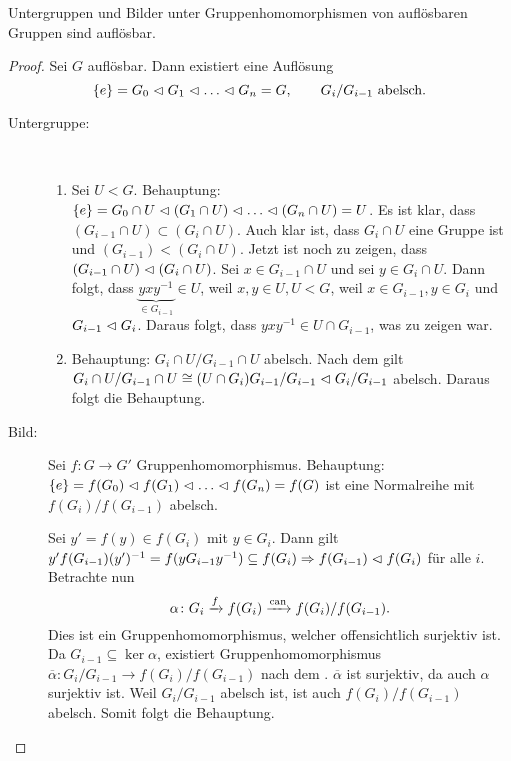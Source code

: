 \documentclass[12pt,a4paper]{scrartcl}
\begin{document}
	\begin{satz}
		Untergruppen und Bilder unter Gruppenhomomorphismen von auflösbaren Gruppen sind auflösbar.
	\end{satz}
	\begin{proof}
		Sei $G$ auflösbar. Dann existiert eine Auflösung 
		\begin{equation*}
			\left\lbrace e\right\rbrace = G_0 \vartriangleleft G_1 \vartriangleleft \ldots \vartriangleleft G_n = G, \qquad  G_i/G_{i-1} \text{ abelsch.}
		\end{equation*}
		\begin{description}
			\item[Untergruppe:]~
				\begin{enumerate}
				\item Sei $U < G$. Behauptung: $\left\lbrace e\right\rbrace = G_0 \cap U \vartriangleleft (G_1 \cap U) \vartriangleleft \ldots \vartriangleleft (G_n \cap U) = U $. Es ist klar, dass $(G_{i-1} \cap U) \subset (G_i \cap U)$. Auch klar ist, dass $G_i \cap U$ eine Gruppe ist und $(G_{i-1} ) < (G_i \cap U)$. Jetzt ist noch zu zeigen, dass $(G_{i-1} \cap U) \vartriangleleft (G_i \cap U)$. Sei $x \in G_{i-1} \cap U$ und sei $y \in G_i \cap U$. Dann folgt, dass $\underbrace{yxy^{-1}}_{\in G_{i-1}} \in U$, weil $x, y \in U, U < G$, weil $x \in G_{i-1}, y \in G_i$ und $G_{i-1} \vartriangleleft G_i$. Daraus folgt, dass $yxy^{-1} \in U \cap G_{i-1}$, was zu zeigen war.
				\item Behauptung: $G_i \cap U / G_{i-1} \cap U$ abelsch. Nach dem  gilt $G_i \cap U / G_{i-1} \cap U \cong (U \cap G_i)G_{i-1}/G_{i-1} \vartriangleleft G_i/G_{i-1}$ abelsch. Daraus folgt die Behauptung.
			\end{enumerate}
			\item[Bild:]
				Sei $f\colon G\to G'$ Gruppenhomomorphismus. Behauptung: $\{e\} = f(G_0)\nt f(G_1)\nt \dots \nt f(G_n ) = f(G)$ ist eine Normalreihe mit $f(G_i)/f(G_{i-1})$ abelsch.
				
				Sei $y' = f(y)\in f(G_i)$ mit $y\in G_i$. Dann gilt $y'f(G_{i-1})(y')^{-1} = f(yG_{i-1}y^{-1})\subseteq f(G_i)\Rightarrow f(G_{i-1})\vartriangleleft f(G_i)$ für alle $i$. Betrachte nun 
\[\alpha\colon G_i\xrightarrow{f} f(G_i)\xrightarrow{\text{can}}f(G_i)/f(G_{i-1}).\] Dies ist ein Gruppenhomomorphismus, welcher offensichtlich surjektiv ist. Da $G_{i-1}\subseteq \ker \alpha$, existiert Gruppenhomomorphismus $\overline{\alpha}\colon G_i/G_{i-1}\to f(G_i)/f(G_{i-1})$ nach dem . $\overline{\alpha}$ ist surjektiv, da auch $\alpha$ surjektiv ist. Weil $G_i/G_{i-1}$ abelsch ist, ist auch $f(G_i)/f(G_{i-1})$ abelsch. Somit folgt die Behauptung.
		\end{description}
\end{proof}
\end{document}
